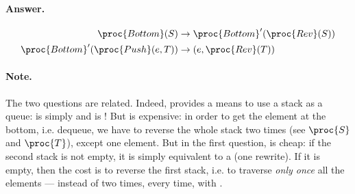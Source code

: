 \paragraph{Answer.}
\begin{align*}
\proc{Bottom}(S) &\rightarrow \proc{Bottom}'(\proc{Rev}(S))\\
\proc{Bottom}'(\proc{Push}(e,T)) &\rightarrow (e, \proc{Rev}(T))
\end{align*}

\paragraph{Note.} The two questions are related. Indeed,
 provides a means to use a stack as a queue:
 is simply  and  is
! But  is expensive: in order to get the
element at the bottom, i.e. dequeue, we have to reverse the whole
stack two times (see \(\proc{S}\) and \(\proc{T}\)), except one
element. But in the first question,  is cheap: if the
second stack is not empty, it is simply equivalent to a 
(one rewrite). If it is empty, then the cost is to reverse the first
stack, i.e. to traverse \emph{only once} all the elements --- instead
of two times, every time, with .
